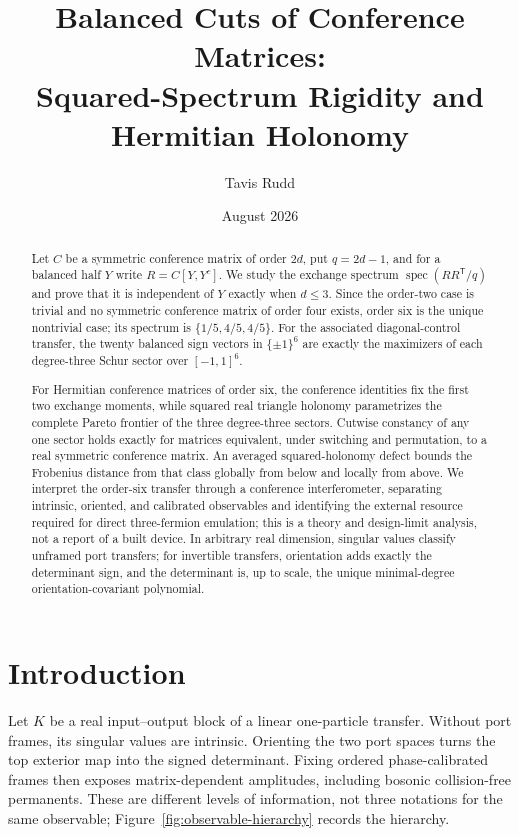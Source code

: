 \documentclass[11pt]{article}
\title{Balanced Cuts of Conference Matrices:\\
Squared-Spectrum Rigidity and Hermitian Holonomy}
\author{Tavis Rudd}
\date{August 2026}
\theoremstyle{remark}
\begin{document}
\maketitle

\begin{abstract}
Let \(C\) be a symmetric conference matrix of order \(2d\), put
\(q=2d-1\), and for a balanced half \(Y\) write
\(R=C[Y,Y^c]\).  We study the exchange spectrum
\(\operatorname{spec}(RR^{\mathsf T}/q)\) and prove that it is independent of
\(Y\) exactly when \(d\le3\).  Since the order-two case is trivial and no
symmetric conference matrix of order four exists, order six is the unique
nontrivial case; its spectrum is \(\{1/5,4/5,4/5\}\).  For the associated
diagonal-control transfer, the twenty balanced sign vectors in
\(\{\pm1\}^6\) are exactly the maximizers of each degree-three Schur sector
over \([-1,1]^6\).

For Hermitian conference matrices of order six, the conference identities fix
the first two exchange moments, while squared real triangle holonomy
parametrizes the complete Pareto frontier of the three degree-three sectors.
Cutwise constancy of any one sector holds exactly for matrices equivalent,
under switching and permutation, to a real symmetric conference matrix.  An
averaged squared-holonomy defect bounds the Frobenius distance from that class
globally from below and locally from above.  We interpret the order-six
transfer through a conference interferometer, separating intrinsic, oriented,
and calibrated observables and identifying the external resource required for
direct three-fermion emulation; this is a theory and design-limit analysis,
not a report of a built device.  In arbitrary real dimension, singular values
classify unframed port transfers; for invertible transfers, orientation adds
exactly the determinant sign, and the determinant is, up to scale, the unique
minimal-degree orientation-covariant polynomial.
\end{abstract}

\section{Introduction}

Let \(K\) be a real input--output block of a linear one-particle transfer.
Without port frames, its singular values are intrinsic.  Orienting the two
port spaces turns the top exterior map into the signed determinant.  Fixing
ordered phase-calibrated frames then exposes matrix-dependent amplitudes,
including bosonic collision-free permanents.  These are different levels of
information, not three notations for the same observable;
Figure~\ref{fig:observable-hierarchy} records the hierarchy.
\end{document}
